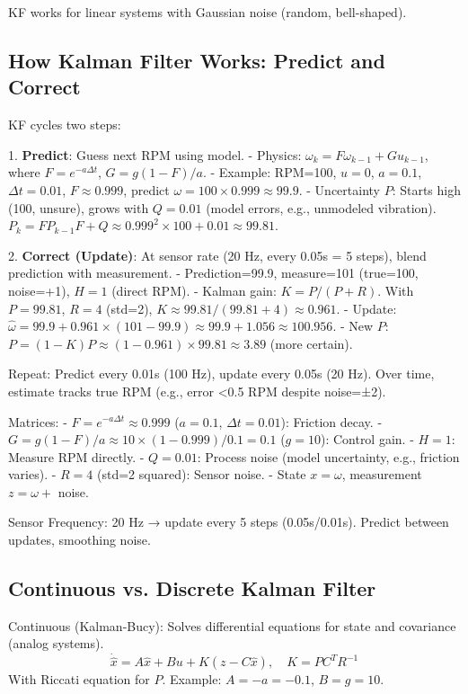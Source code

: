 \documentclass[conference]{IEEEtran}
\begin{document}
	KF works for linear systems with Gaussian noise (random, bell-shaped).
	
	\subsection{How Kalman Filter Works: Predict and Correct}
	KF cycles two steps:
	
	1. \textbf{Predict}: Guess next RPM using model.
	- Physics: $\omega_k = F \omega_{k-1} + G u_{k-1}$, where $F = e^{-a \Delta t}$, $G = g (1 - F)/a$.
	- Example: RPM=100, $u=0$, $a=0.1$, $\Delta t=0.01$, $F \approx 0.999$, predict $\omega = 100 \times 0.999 \approx 99.9$.
	- Uncertainty $P$: Starts high (100, unsure), grows with $Q=0.01$ (model errors, e.g., unmodeled vibration). $P_k = F P_{k-1} F + Q \approx 0.999^2 \times 100 + 0.01 \approx 99.81$.
	
	2. \textbf{Correct (Update)}: At sensor rate (20 Hz, every 0.05s = 5 steps), blend prediction with measurement.
	- Prediction=99.9, measure=101 (true=100, noise=+1), $H=1$ (direct RPM).
	- Kalman gain: $K = P / (P + R)$. With $P=99.81$, $R=4$ (std=2), $K \approx 99.81 / (99.81 + 4) \approx 0.961$.
	- Update: $\hat{\omega} = 99.9 + 0.961 \times (101 - 99.9) \approx 99.9 + 1.056 \approx 100.956$.
	- New $P$: $P = (1 - K) P \approx (1 - 0.961) \times 99.81 \approx 3.89$ (more certain).
	
	Repeat: Predict every 0.01s (100 Hz), update every 0.05s (20 Hz). Over time, estimate tracks true RPM (e.g., error <0.5 RPM despite noise=±2).
	
	Matrices:
	- $F = e^{-a \Delta t} \approx 0.999$ ($a=0.1$, $\Delta t=0.01$): Friction decay.
	- $G = g (1 - F)/a \approx 10 \times (1 - 0.999)/0.1 = 0.1$ ($g=10$): Control gain.
	- $H = 1$: Measure RPM directly.
	- $Q=0.01$: Process noise (model uncertainty, e.g., friction varies).
	- $R=4$ (std=2 squared): Sensor noise.
	- State $x = \omega$, measurement $z = \omega +$ noise.
	
	Sensor Frequency: 20 Hz → update every 5 steps (0.05s/0.01s). Predict between updates, smoothing noise.
	
	\subsection{Continuous vs. Discrete Kalman Filter}
	Continuous (Kalman-Bucy): Solves differential equations for state and covariance (analog systems).
	\begin{equation}
		\dot{\hat{x}} = A \hat{x} + B u + K (z - C \hat{x}), \quad K = P C^T R^{-1}
	\end{equation}
	With Riccati equation for $P$. Example: $A = -a = -0.1$, $B = g = 10$.
	
\end{document}
